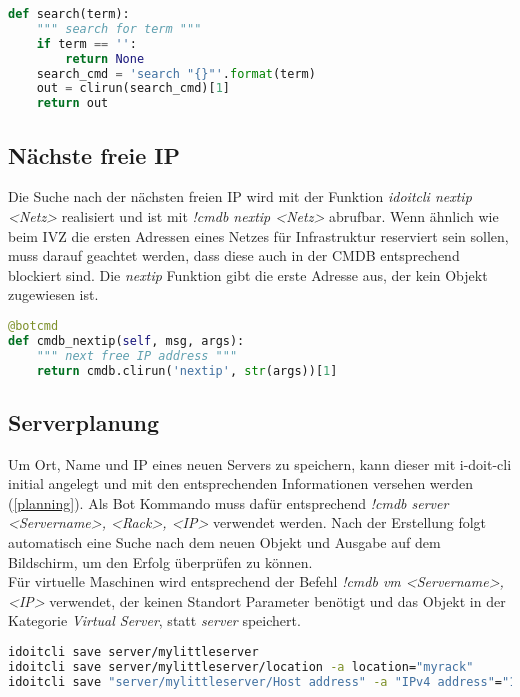 \begin{lstlisting}[language=python, label=cmdbsearch, caption=Suchfunktion]
def search(term):
    """ search for term """
    if term == '':
        return None
    search_cmd = 'search "{}"'.format(term)
    out = clirun(search_cmd)[1]
    return out
\end{lstlisting}


\subsection{Nächste freie IP}
Die Suche nach der nächsten freien IP wird mit der Funktion \textit{idoitcli nextip <Netz>} realisiert und ist mit \textit{!cmdb nextip <Netz>} abrufbar. Wenn ähnlich wie beim IVZ die ersten Adressen eines Netzes für Infrastruktur reserviert sein sollen, muss darauf geachtet werden, dass diese auch in der \acs{CMDB} 
entsprechend blockiert sind. Die \textit{nextip} Funktion gibt die erste Adresse aus, der kein Objekt zugewiesen ist.

\begin{lstlisting}[language=python, label=nextip, caption=Nächste freie IP]
@botcmd
def cmdb_nextip(self, msg, args):
    """ next free IP address """
    return cmdb.clirun('nextip', str(args))[1]
\end{lstlisting}


\subsection{Serverplanung}
Um Ort, Name und IP eines neuen Servers zu speichern, kann dieser mit i-doit-cli initial angelegt und mit den entsprechenden Informationen versehen werden (\autoref{planning}). Als Bot Kommando muss dafür entsprechend \textit{!cmdb server <Servername>, <Rack>, <IP>} verwendet werden. Nach der Erstellung folgt automatisch eine Suche nach dem neuen Objekt und Ausgabe auf dem Bildschirm, um den Erfolg überprüfen zu können.\\
Für virtuelle Maschinen wird entsprechend der Befehl \textit{!cmdb vm <Servername>, <IP>} verwendet, der keinen Standort Parameter benötigt und das Objekt in der Kategorie \textit{Virtual Server}, statt \textit{server} speichert.

\begin{lstlisting}[language=bash, label=planning, caption=Serverplanung mit i-doit-cli]
idoitcli save server/mylittleserver
idoitcli save server/mylittleserver/location -a location="myrack"
idoitcli save "server/mylittleserver/Host address" -a "IPv4 address"="192.168.0.2"
\end{lstlisting}

